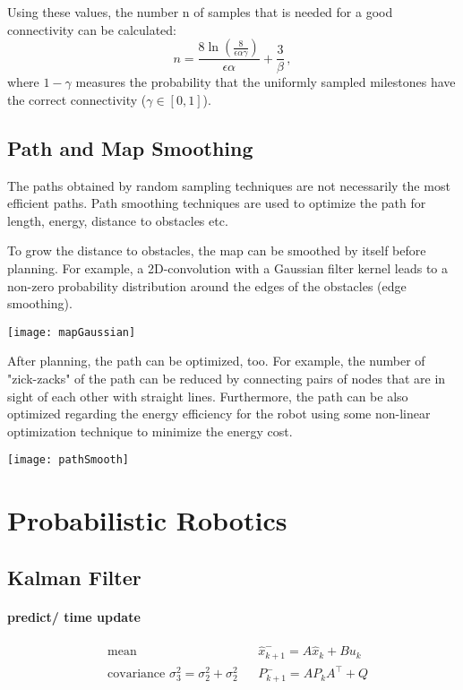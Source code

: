 \begin{multicols*}{2}
Using these values, the number n of samples that is needed for a good connectivity can be calculated:
\[ n= \frac{8 \ln (\frac{8}{\epsilon\alpha\gamma})}{\epsilon\alpha} + \frac{3}{\beta} \,, \] 
where $1-\gamma$ measures the probability that the uniformly sampled milestones have the correct connectivity ($\gamma \in [0,1]$).

\subsection{Path and Map Smoothing}
The paths obtained by random sampling techniques are not necessarily the most efficient paths. Path smoothing techniques are used to optimize the path for length, energy, distance to obstacles etc. 

To grow the distance to obstacles, the map can be smoothed by itself before planning. For example, a 2D-convolution with a Gaussian filter kernel leads to a non-zero probability distribution around the edges of the obstacles (edge smoothing).

\texttt{[image: mapGaussian]}
 
After planning, the path can be optimized, too. For example, the number of "zick-zacks" of the path can be reduced by connecting pairs of nodes that are in sight of each other with straight lines. Furthermore, the path can be also optimized regarding the energy efficiency for the robot using some non-linear optimization technique to minimize the energy cost.

\texttt{[image: pathSmooth]}

\section{Probabilistic Robotics}

\subsection{Kalman Filter}

\paragraph{predict/ time update}

\begin{align}
	&\text{mean} && \hat{x}_{k+1}^- = A \hat{x}_{k} + B u_k  \\
	&\text{covariance } \sigma_3^2 = \sigma_2^2 + \sigma_2^2 && P_{k+1}^- = A P_k A^\top + Q 
\end{align}


\end{multicols*}
